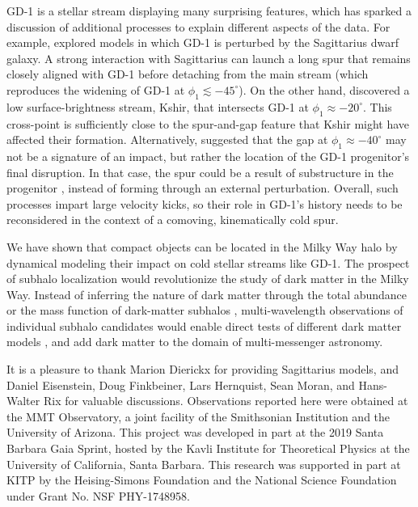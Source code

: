\documentclass[twocolumn]{aastex63}
\begin{document}
GD-1 is a stellar stream displaying many surprising features, which has sparked a discussion of additional processes to explain different aspects of the data.
For example, \citet{deboer2019} explored models in which GD-1 is perturbed by the Sagittarius dwarf galaxy.
A strong interaction with Sagittarius can launch a long spur that remains closely aligned with GD-1 before detaching from the main stream (which reproduces the widening of GD-1 at $\phi_1\lesssim-45^\circ$).
On the other hand, \citet{malhan2019c} discovered a low surface-brightness stream, Kshir, that intersects GD-1 at $\phi_1\approx-20^\circ$.
This cross-point is sufficiently close to the spur-and-gap feature that Kshir might have affected their formation.
Alternatively, \citet{webb2019} suggested that the gap at $\phi_1\approx-40^\circ$ may not be a signature of an impact, but rather the location of the GD-1 progenitor's final disruption.
In that case, the spur could be a result of substructure in the progenitor \citep[e.g.,][]{carlberg2018}, instead of forming through an external perturbation.
Overall, such processes impart large velocity kicks, so their role in GD-1's history needs to be reconsidered in the context of a comoving, kinematically cold spur.


We have shown that compact objects can be located in the Milky Way halo by dynamical modeling their impact on cold stellar streams like GD-1.
The prospect of subhalo localization would revolutionize the study of dark matter in the Milky Way.
Instead of inferring the nature of dark matter through the total abundance \citep[e.g.,][]{carlberg2013} or the mass function of dark-matter subhalos \citep[e.g.,][]{banik2019}, multi-wavelength observations of individual subhalo candidates would enable direct tests of different dark matter models \citep[e.g.,][]{daylan2016}, and add dark matter to the domain of multi-messenger astronomy.

\vspace{0.5cm}
It is a pleasure to thank Marion Dierickx for providing Sagittarius models, and Daniel Eisenstein, Doug Finkbeiner, Lars Hernquist, Sean Moran, and Hans-Walter Rix for valuable discussions.
Observations reported here were obtained at the MMT Observatory, a joint facility of the Smithsonian Institution and the University of Arizona.
This project was developed in part at the 2019 Santa Barbara Gaia Sprint, hosted by the Kavli Institute for Theoretical Physics at the University of California, Santa Barbara.
This research was supported in part at KITP by the Heising-Simons Foundation and the National Science Foundation under Grant No. NSF PHY-1748958.
\end{document}
